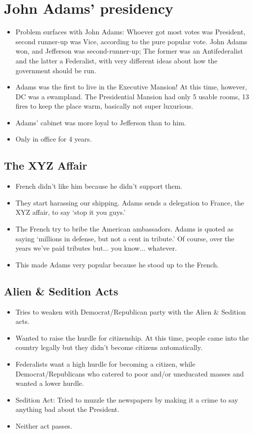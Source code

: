 \documentclass{article}
\begin{document}
  \section{John Adams' presidency}
    \begin{itemize}
      \item Problem surfaces with John Adams: Whoever got most votes was President, second runner-up was Vice, according to the pure popular vote. John Adams won, and Jefferson was second-runner-up; The former was an Antifederalist and the latter a Federalist, with very different ideas about how the government should be run.
      \item Adams was the first to live in the Executive Mansion! At this time, however, DC was a swampland. The Presidential Mansion had only 5 usable rooms, 13 fires to keep the place warm, basically not super luxurious.
      \item Adams' cabinet was more loyal to Jefferson than to him. 
      \item Only in office for 4 years.
    \end{itemize}
    \subsection{The XYZ Affair}
        \begin{itemize}
           \item French didn't like him because he didn't support them.
           \item They start harassing our shipping. Adams sends a delegation to France, the XYZ affair, to say `stop it you guys.'
           \item The French try to bribe the American ambassadors. Adams is quoted as saying `millions in defense, but not a cent in tribute.' Of course, over the years we've paid tributes but... you know... whatever.
           \item This made Adams very popular because he stood up to the French.
        \end{itemize}
      \subsection{Alien \& Sedition Acts}
        \begin{itemize}
          \item Tries to weaken with Democrat/Republican party with the Alien \& Sedition acts.
          \item Wanted to raise the hurdle for citizenship. At this time, people came into the country legally but they didn't become citizens automatically.
          \item Federalists want a high hurdle for becoming a citizen, while Democrat/Republicans who catered to poor and/or uneducated masses and wanted a lower hurdle.
          \item Sedition Act: Tried to muzzle the newspapers by making it a crime to say anything bad about the President.
          \item Neither act passes. 
        \end{itemize}
\end{document}
